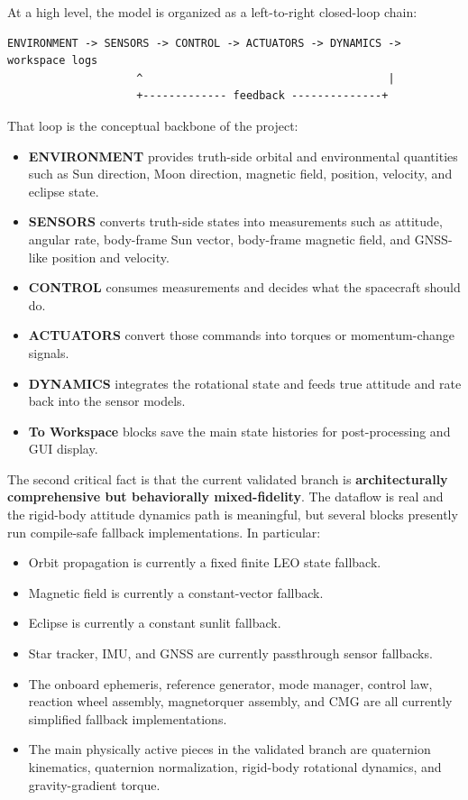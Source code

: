 \documentclass[11pt]{article}
\begin{document}
At a high level, the model is organized as a left-to-right closed-loop chain:

\begin{verbatim}
ENVIRONMENT -> SENSORS -> CONTROL -> ACTUATORS -> DYNAMICS -> workspace logs
                    ^                                      |
                    +------------- feedback --------------+
\end{verbatim}

That loop is the conceptual backbone of the project:

\begin{itemize}
\item \textbf{ENVIRONMENT} provides truth-side orbital and environmental quantities such as Sun direction, Moon direction, magnetic field, position, velocity, and eclipse state.
\item \textbf{SENSORS} converts truth-side states into measurements such as attitude, angular rate, body-frame Sun vector, body-frame magnetic field, and GNSS-like position and velocity.
\item \textbf{CONTROL} consumes measurements and decides what the spacecraft should do.
\item \textbf{ACTUATORS} convert those commands into torques or momentum-change signals.
\item \textbf{DYNAMICS} integrates the rotational state and feeds true attitude and rate back into the sensor models.
\item \textbf{To Workspace} blocks save the main state histories for post-processing and GUI display.
\end{itemize}

The second critical fact is that the current validated branch is \textbf{architecturally comprehensive but behaviorally mixed-fidelity}. The dataflow is real and the rigid-body attitude dynamics path is meaningful, but several blocks presently run compile-safe fallback implementations. In particular:

\begin{itemize}
\item Orbit propagation is currently a fixed finite LEO state fallback.
\item Magnetic field is currently a constant-vector fallback.
\item Eclipse is currently a constant sunlit fallback.
\item Star tracker, IMU, and GNSS are currently passthrough sensor fallbacks.
\item The onboard ephemeris, reference generator, mode manager, control law, reaction wheel assembly, magnetorquer assembly, and CMG are all currently simplified fallback implementations.
\item The main physically active pieces in the validated branch are quaternion kinematics, quaternion normalization, rigid-body rotational dynamics, and gravity-gradient torque.
\end{itemize}
\end{document}
